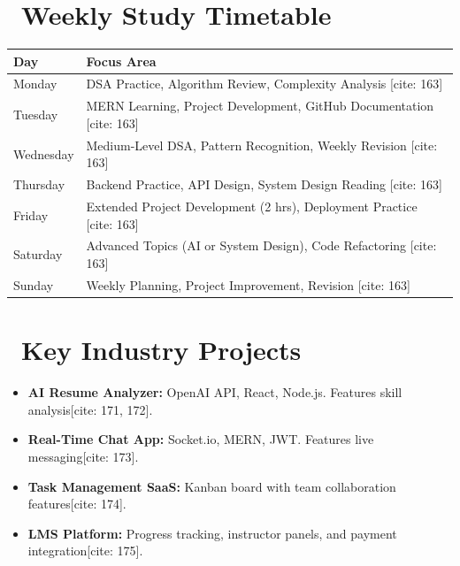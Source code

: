 \documentclass[10pt,letterpaper]{article}
\begin{document}
\section{\faCalendar* \ Weekly Study Timetable}
\renewcommand{\arraystretch}{1.4}
\begin{tabularx}{\textwidth}{|l|X|}
    \hline
    \rowcolor{gray!10} \textbf{Day} & \textbf{Focus Area} \\ \hline
    Monday & DSA Practice, Algorithm Review, Complexity Analysis [cite: 163] \\ \hline
    Tuesday & MERN Learning, Project Development, GitHub Documentation [cite: 163] \\ \hline
    Wednesday & Medium-Level DSA, Pattern Recognition, Weekly Revision [cite: 163] \\ \hline
    Thursday & Backend Practice, API Design, System Design Reading [cite: 163] \\ \hline
    Friday & Extended Project Development (2 hrs), Deployment Practice [cite: 163] \\ \hline
    Saturday & Advanced Topics (AI or System Design), Code Refactoring [cite: 163] \\ \hline
    Sunday & Weekly Planning, Project Improvement, Revision [cite: 163] \\ \hline
\end{tabularx}

\section{\faCode \ Key Industry Projects}
\begin{itemize}[noitemsep, leftmargin=0.2in]
    \item \small \textbf{AI Resume Analyzer:} OpenAI API, React, Node.js. Features skill analysis[cite: 171, 172].
    \item \small \textbf{Real-Time Chat App:} Socket.io, MERN, JWT. Features live messaging[cite: 173].
    \item \small \textbf{Task Management SaaS:} Kanban board with team collaboration features[cite: 174].
    \item \small \textbf{LMS Platform:} Progress tracking, instructor panels, and payment integration[cite: 175].
\end{itemize}

\end{document}
